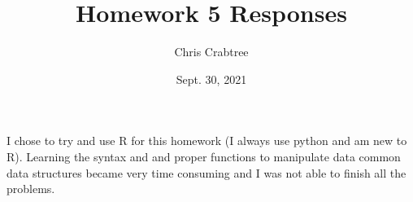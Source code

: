 \documentclass[12pt]{article}
\begin{document}
\title{Homework 5 Responses}
\author{Chris Crabtree}
\date{Sept. 30, 2021}

{
\let\clearpage\relax
\maketitle
}
I chose to try and use R for this homework (I always use python and am new to R). 
Learning the syntax and and proper functions to manipulate data common data structures became very time consuming and I was not able to finish all the problems.

      













\end{document}
